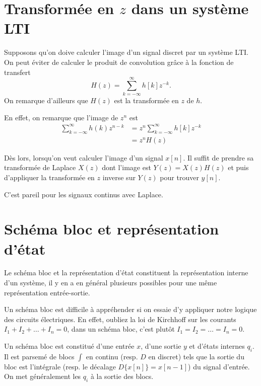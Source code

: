 
\section{Transformée en $z$ dans un système LTI}
Supposons qu'on doive calculer l'image d'un signal discret par un système LTI.
On peut éviter de calculer le produit de convolution grâce à la fonction
de transfert
\[ H(z) = \sum_{k=-\infty}^{\infty} h[k] z^{-k}. \]
On remarque d'ailleurs que $H(z)$ est la transformée en $z$ de $h$.

En effet, on remarque que l'image de $z^n$ est
\begin{align*}
  \sum_{k=-\infty}^{\infty} h(k) z^{n-k} &
  = z^{n} \sum_{k=-\infty}^{\infty} h[k] z^{-k}\\
  & = z^n H(z)
\end{align*}

Dès lors, lorsqu'on veut calculer l'image d'un signal $x[n]$. Il suffit de
prendre sa transformée de Laplace $X(z)$ dont l'image est $Y(z) = X(z) H(z)$
et puis d'appliquer la transformée en $z$ inverse sur $Y(z)$ pour trouver
$y[n]$.

C'est pareil pour les signaux continus avec Laplace.

\section{Schéma bloc et représentation d'état}
Le schéma bloc et la représentation d'état constituent la représentation
interne d'un système, il y en a en général plusieurs possibles pour une
même représentation entrée-sortie.

Un schéma bloc est difficile à appréhender si on essaie d'y appliquer
notre logique des circuits électriques.
En effet, oubliez la loi de Kirchhoff sur les courants
$I_1 + I_2 + \ldots + I_n = 0$, dans un schéma bloc, c'est plutôt
$I_1 = I_2 = \ldots = I_n = 0$.

Un schéma bloc est constitué d'une entrée $x$, d'une sortie $y$ et
d'états internes $q_i$.
Il est parsemé de blocs $\int$ en continu (resp. $D$ en discret) tels que
la sortie du bloc est l'intégrale (resp. le décalage $D\{x[n]\} = x[n-1]$) du
signal d'entrée.
On met généralement les $q_i$ à la sortie des blocs.


